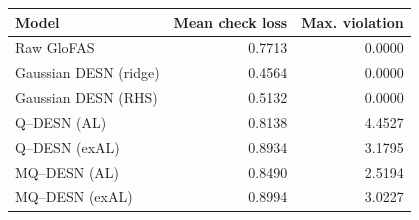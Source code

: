 \begin{tabular}{@{}lrr@{}}
\toprule
Model & Mean check loss & Max. violation \\
\midrule
Raw GloFAS & 0.7713 & 0.0000 \\
Gaussian DESN (ridge) & 0.4564 & 0.0000 \\
Gaussian DESN (RHS) & 0.5132 & 0.0000 \\
Q--DESN (AL) & 0.8138 & 4.4527 \\
Q--DESN (exAL) & 0.8934 & 3.1795 \\
MQ--DESN (AL) & 0.8490 & 2.5194 \\
MQ--DESN (exAL) & 0.8994 & 3.0227 \\
\bottomrule
\end{tabular}
